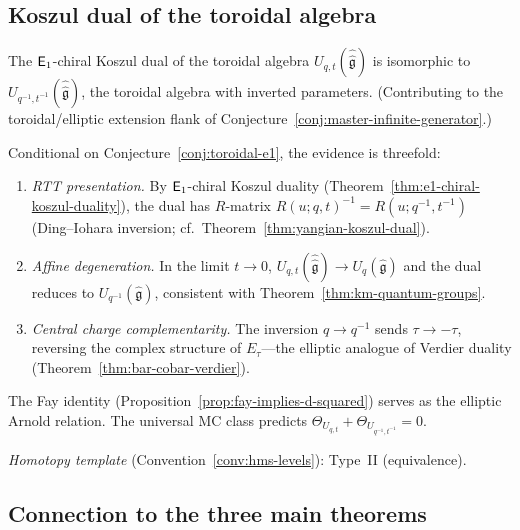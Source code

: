 \subsection{Koszul dual of the toroidal algebra}

\begin{conjecture}
\label{conj:toroidal-koszul-dual}
The $\mathsf{E}_1$-chiral Koszul dual of the toroidal algebra
$U_{q,t}(\hat{\hat{\mathfrak{g}}})$ is isomorphic to
$U_{q^{-1},t^{-1}}(\hat{\hat{\mathfrak{g}}})$,
the toroidal algebra with inverted parameters.
(Contributing to the toroidal/elliptic extension flank of
Conjecture~\ref{conj:master-infinite-generator}.)
\end{conjecture}

\begin{remark}[Evidence]\label{rem:toroidal-koszul-evidence}
Conditional on Conjecture~\ref{conj:toroidal-e1}, the evidence is threefold:
\begin{enumerate}[label=\textup{(\roman*)}]
\item \emph{RTT presentation.}  By $\mathsf{E}_1$-chiral Koszul duality (Theorem~\ref{thm:e1-chiral-koszul-duality}), the dual has $R$-matrix $R(u;q,t)^{-1} = R(u;q^{-1},t^{-1})$ (Ding--Iohara inversion; cf.\ Theorem~\ref{thm:yangian-koszul-dual}).
\item \emph{Affine degeneration.}  In the limit $t \to 0$, $U_{q,t}(\hat{\hat{\mathfrak{g}}}) \to U_q(\hat{\mathfrak{g}})$ and the dual reduces to $U_{q^{-1}}(\hat{\mathfrak{g}})$, consistent with Theorem~\ref{thm:km-quantum-groups}.
\item \emph{Central charge complementarity.}  The inversion $q \to q^{-1}$ sends $\tau \to -\tau$, reversing the complex structure of $E_\tau$---the elliptic analogue of Verdier duality (Theorem~\ref{thm:bar-cobar-verdier}).
\end{enumerate}
The Fay identity (Proposition~\ref{prop:fay-implies-d-squared}) serves as the elliptic Arnold relation.  The universal MC class predicts $\Theta_{U_{q,t}} + \Theta_{U_{q^{-1},t^{-1}}} = 0$.

\emph{Homotopy template} (Convention~\ref{conv:hms-levels}): Type~II (equivalence).
\end{remark}

\subsection{Connection to the three main theorems}

